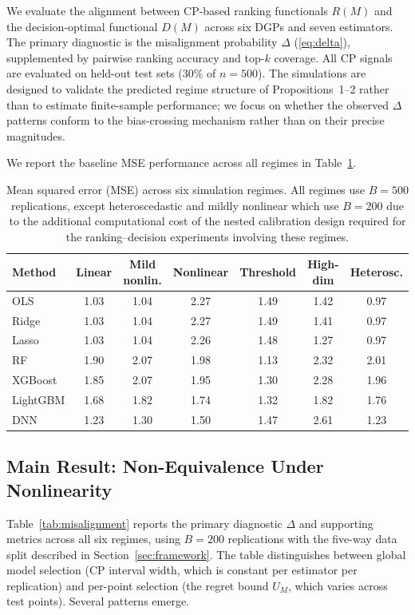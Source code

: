 \documentclass[a4paper,11pt]{article}
\begin{document}
We evaluate the alignment between CP-based ranking functionals $R(M)$ and the decision-optimal functional $D(M)$ across six DGPs and seven estimators. The primary diagnostic is the misalignment probability $\Delta$ (\ref{eq:delta}), supplemented by pairwise ranking accuracy and top-$k$ coverage. All CP signals are evaluated on held-out test sets (30\% of $n=500$). The simulations are designed to validate the predicted regime structure of Propositions~1--2 rather than to estimate finite-sample performance; we focus on whether the observed $\Delta$ patterns conform to the bias-crossing mechanism rather than on their precise magnitudes.

We report the baseline MSE performance across all regimes in Table~\ref{tab:baseline}.

\begin{table}[t]
    \centering
    \caption{Mean squared error (MSE) across six simulation regimes. All regimes use $B=500$ replications, except heteroscedastic and mildly nonlinear which use $B=200$ due to the additional computational cost of the nested calibration design required for the ranking--decision experiments involving these regimes.}
    \label{tab:baseline}
    \begin{tabular}{lcccccc}
        \toprule
        Method & Linear & Mild nonlin. & Nonlinear & Threshold & High-dim & Heterosc. \\
        \midrule
        OLS     & 1.03 & 1.04 & 2.27 & 1.49 & 1.42 & 0.97 \\
        Ridge   & 1.03 & 1.04 & 2.27 & 1.49 & 1.41 & 0.97 \\
        Lasso   & 1.03 & 1.04 & 2.26 & 1.48 & 1.27 & 0.97 \\
        RF      & 1.90 & 2.07 & 1.98 & 1.13 & 2.32 & 2.01 \\
        XGBoost & 1.85 & 2.07 & 1.95 & 1.30 & 2.28 & 1.96 \\
        LightGBM& 1.68 & 1.82 & 1.74 & 1.32 & 1.82 & 1.76 \\
        DNN     & 1.23 & 1.30 & 1.50 & 1.47 & 2.61 & 1.23 \\
        \bottomrule
    \end{tabular}
\end{table}

\subsection{Main Result: Non-Equivalence Under Nonlinearity}

Table~\ref{tab:misalignment} reports the primary diagnostic $\Delta$ and supporting metrics across all six regimes, using $B = 200$ replications with the five-way data split described in Section~\ref{sec:framework}. The table distinguishes between global model selection (CP interval width, which is constant per estimator per replication) and per-point selection (the regret bound $U_M$, which varies across test points). Several patterns emerge.
\end{document}
